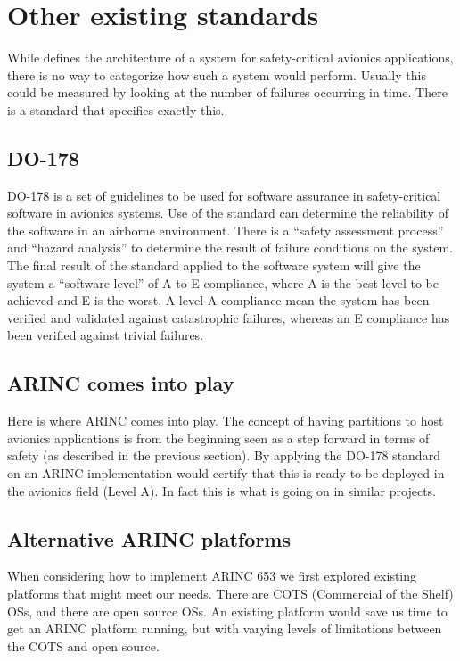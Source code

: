 \section{Other existing standards}
While \arinc{} defines the architecture of a system for safety-critical
avionics applications, there is no way to categorize how such a system
would perform. Usually this could be measured by looking at the number 
of failures occurring in time. There is a standard that specifies exactly this.

\subsection{DO-178}
DO-178 is a set of guidelines to be used for software assurance in safety-critical software in avionics systems.
Use of the standard can determine the reliability of the software in an airborne environment.
There is a ``safety assessment process'' and ``hazard analysis'' to determine the result of failure conditions on the system.
The final result of the standard applied to the software system will give the system a ``software level'' of A to E compliance,
where A is the best level to be achieved and E is the worst.
A level A compliance mean the system has been verified and validated against catastrophic failures,
whereas an E compliance has been verified against trivial failures.

\subsection{ARINC comes into play}
Here is where ARINC comes into play. The concept of having partitions 
to host avionics applications is from the beginning seen as a step 
forward in terms of safety (as described in the previous section).
By applying the DO-178 standard on an ARINC implementation would certify
that this is ready to be deployed in the avionics field (Level A).
In fact this is what is going on in similar projects.

\subsection{Alternative ARINC platforms}
When considering how to implement ARINC 653 we first explored existing platforms that might meet our needs.
There are COTS (Commercial of the Shelf) OSs, and there are open source OSs.
An existing platform would save us time to get an ARINC platform running,
but with varying levels of limitations between the COTS and open source.


